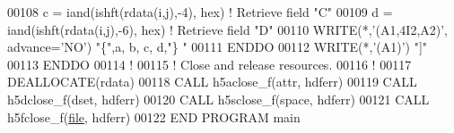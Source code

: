 \begin{DoxyCode}
00108         c = iand(ishft(rdata(i,j),-4), hex) \textcolor{comment}{! Retrieve field "C"}
00109         d = iand(ishft(rdata(i,j),-6), hex) \textcolor{comment}{! Retrieve field "D"}
00110         \textcolor{keyword}{WRITE}(*,\textcolor{stringliteral}{'(A1,4I2,A2)'}, advance=\textcolor{stringliteral}{'NO'}) \textcolor{stringliteral}{"\{"},a, b, c, d,\textcolor{stringliteral}{"\} "}
00111 \textcolor{keywordflow}{     ENDDO}
00112      \textcolor{keyword}{WRITE}(*,\textcolor{stringliteral}{'(A1)'}) \textcolor{stringliteral}{"]"}
00113 \textcolor{keywordflow}{  ENDDO}
00114   \textcolor{comment}{!}
00115   \textcolor{comment}{! Close and release resources.}
00116   \textcolor{comment}{!}
00117   \textcolor{keyword}{DEALLOCATE}(rdata)
00118   \textcolor{keyword}{CALL }h5aclose\_f(attr, hdferr)
00119   \textcolor{keyword}{CALL }h5dclose\_f(dset, hdferr)
00120   \textcolor{keyword}{CALL }h5sclose\_f(space, hdferr)
00121   \textcolor{keyword}{CALL }h5fclose\_f(\hyperlink{structfile}{file}, hdferr)
00122 \textcolor{keyword}{END PROGRAM }main
\end{DoxyCode}
